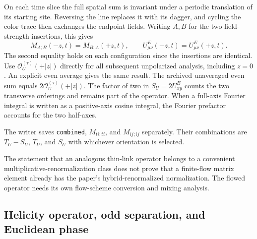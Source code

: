 \documentclass[11pt]{article}
\numberwithin{equation}{section}
\newcommand{\cO}{\mathcal{O}}
\begin{document}
On each time slice the full spatial sum is invariant under a periodic
translation of its starting site.  Reversing the line replaces it with its
dagger, and cycling the color trace then exchanges the endpoint fields.
Writing \(A,B\) for the two field-strength insertions, this gives
\begin{equation}
 M_{A;B}(-z,t)=M_{B;A}(+z,t),\qquad
 U^E_{\mu\nu}(-z,t)=U^E_{\mu\nu}(+z,t).
 \label{eq:unpolarized-positive-orientation}
\end{equation}
The second equality holds on each configuration since the insertions are
identical.  Use \(\cO_U^{(\tau)}(+|z|)\) directly for all subsequent
unpolarized analysis, including \(z=0\).  An explicit even average gives the
same result.  The archived unaveraged even sum equals \(2\cO_U^{(\tau)}(+|z|)\).
The factor of two in \(S_U=2U^E_{xy}\) counts the two transverse orderings
and remains part of the operator.  When a full-axis Fourier integral is
written as a positive-axis cosine integral, the Fourier prefactor accounts
for the two half-axes.

The writer saves \texttt{combined}, \(M_{ti;ti}\), and \(M_{ij;ij}\)
separately.  Their combinations are \(T_U-S_U\), \(T_U\), and \(S_U\) with
whichever orientation is selected.

The statement that an analogous thin-link operator belongs to a convenient
multiplicative-renormalization class does not prove that a finite-flow
matrix element already has the paper's hybrid-renormalized normalization.
The flowed operator needs its own flow-scheme conversion and mixing analysis.

\subsection{Helicity operator, odd separation, and Euclidean phase}
\end{document}
